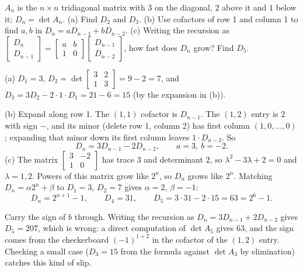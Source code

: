 \begin{exercise}[Question 9]\label{exr:u40-q9}
$A_n$ is the $n\times n$ tridiagonal matrix with $3$ on the diagonal, $2$ above it and $1$ below it; $D_n=\det A_n$.
(a) Find $D_2$ and $D_3$.
(b) Use cofactors of row 1 and column 1 to find $a,b$ in $D_n=aD_{n-1}+bD_{n-2}$.
(c) Writing the recursion as $\begin{bmatrix}D_n\\D_{n-1}\end{bmatrix}=\begin{bmatrix}a&b\\1&0\end{bmatrix}\begin{bmatrix}D_{n-1}\\D_{n-2}\end{bmatrix}$, how fast does $D_n$ grow? Find $D_5$.
\end{exercise}
\begin{solution}
(a) $D_1=3$, $D_2=\det\begin{bmatrix}3&2\\1&3\end{bmatrix}=9-2=7$, and $D_3=3D_2-2\cdot1\cdot D_1=21-6=15$ (by the expansion in (b)).

(b) Expand along row 1. The $(1,1)$ cofactor is $D_{n-1}$. The $(1,2)$ entry is $2$ with sign $-$, and its minor (delete row 1, column 2) has first column $(1,0,\dots,0)$; expanding that minor down its first column leaves $1\cdot D_{n-2}$. So
\[
D_n=3D_{n-1}-2D_{n-2},\qquad a=3,\ b=-2.
\]
(c) The matrix $\begin{bmatrix}3&-2\\1&0\end{bmatrix}$ has trace $3$ and determinant $2$, so $\lambda^{2}-3\lambda+2=0$ and $\lambda=1,2$. Powers of this matrix grow like $2^{n}$, so $D_n$ grows like $2^{n}$. Matching $D_n=\alpha2^{n}+\beta$ to $D_1=3$, $D_2=7$ gives $\alpha=2$, $\beta=-1$:
\[
D_n=2^{n+1}-1,\qquad D_4=31,\qquad D_5=3\cdot31-2\cdot15=63=2^{6}-1.
\]
\end{solution}

\begin{trap}
Carry the sign of $b$ through. Writing the recursion as $D_n=3D_{n-1}+2D_{n-2}$ gives $D_5=207$, which is wrong: a direct computation of $\det A_5$ gives $63$, and the sign comes from the checkerboard $(-1)^{1+2}$ in the cofactor of the $(1,2)$ entry. Checking a small case ($D_3=15$ from the formula against $\det A_3$ by elimination) catches this kind of slip.
\end{trap}
